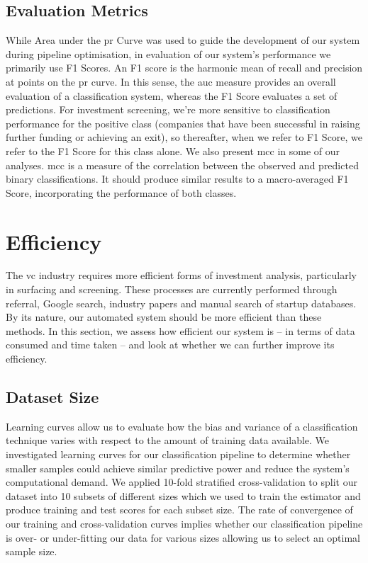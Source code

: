 \documentclass[../thesis/thesis.tex]{subfiles}
\begin{document}
\subsection{Evaluation Metrics}

While Area under the \gls{pr} Curve was used to guide the development of our system during pipeline optimisation, in evaluation of our system's performance we primarily use F1 Scores. An F1 score is the harmonic mean of recall and precision at points on the \gls{pr} curve. In this sense, the \gls{auc} measure provides an overall evaluation of a classification system, whereas the F1 Score evaluates a set of predictions. For investment screening, we're more sensitive to classification performance for the positive class (companies that have been successful in raising further funding or achieving an exit), so thereafter, when we refer to F1 Score, we refer to the F1 Score for this class alone. We also present \gls{mcc} in some of our analyses. \Gls{mcc} is a measure of the correlation between the observed and predicted binary classifications. It should produce similar results to a macro-averaged F1 Score, incorporating the performance of both classes.

\section{Efficiency}

The \gls{vc} industry requires more efficient forms of investment analysis, particularly in surfacing and screening. These processes are currently performed through referral, Google search, industry papers and manual search of startup databases. By its nature, our automated system should be more efficient than these methods. In this section, we assess how efficient our system is -- in terms of data consumed and time taken -- and look at whether we can further improve its efficiency.

\subsection{Dataset Size}

Learning curves allow us to evaluate how the bias and variance of a classification technique varies with respect to the amount of training data available. We investigated learning curves for our classification pipeline to determine whether smaller samples could achieve similar predictive power and reduce the system's computational demand. We applied 10-fold stratified cross-validation to split our dataset into 10 subsets of different sizes which we used to train the estimator and produce training and test scores for each subset size. The rate of convergence of our training and cross-validation curves implies whether our classification pipeline is over- or under-fitting our data for various sizes allowing us to select an optimal sample size.
\end{document}
